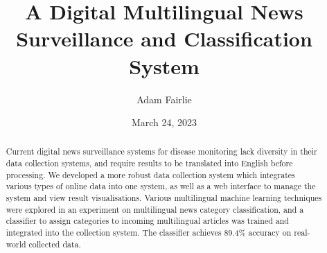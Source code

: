 \documentclass{l4proj}
\begin{document}
\title{A Digital Multilingual News Surveillance and Classification System}
\author{Adam Fairlie}
\date{March 24, 2023}

\maketitle

\begin{abstract}
    Current digital news surveillance systems for disease monitoring lack diversity in their data collection systems, and require results to be translated into English before processing. We developed a more robust data collection system which integrates various types of online data into one system, as well as a web interface to manage the system and view result visualisations. Various multilingual machine learning techniques were explored in an experiment on multilingual news category classification, and a classifier to assign categories to incoming multilingual articles was trained and integrated into the collection system. The classifier achieves 89.4\% accuracy on real-world collected data.
\end{abstract}


%
%
\def\consentname {Adam Fairlie} %
\def\consentdate {24 March 2023} %
%
\educationalconsent


\tableofcontents
\end{document}
